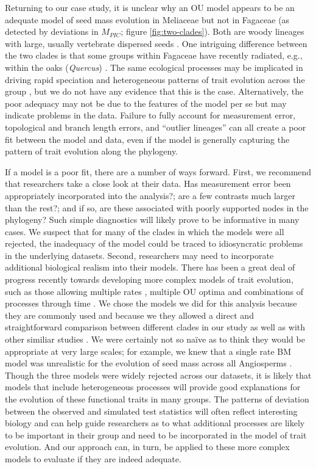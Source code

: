 \documentclass[a4paper,11pt]{article}
\begin{document}
Returning to our case study, it is unclear why an OU model appears to be an adequate model of seed mass evolution in Meliaceae but not in Fagaceae (as detected by deviations in $M_{PIC}$; figure \ref{fig:two-clades}).  
Both are woody lineages with large, usually vertebrate dispersed seeds \citep{Pannell1987, Manos2001}. One intriguing difference between the two clades is that some groups within Fagaceae have recently radiated, e.g., within the oaks (\emph{Quercus}) \citep{Simeone2013}. The same ecological processes may be implicated in driving rapid speciation and heterogeneous patterns of trait evolution across the group \citep{Schluter2000}, but we do not have any evidence that this is the case. Alternatively, the poor adequacy may not be due to the features of the model per se but may indicate problems in the data. Failure to fully account for measurement error, topological and branch length errors, and ``outlier lineages'' \citep[see][]{SlaterPennell} can all create a poor fit between the model and data, even if the model is generally capturing the pattern of trait evolution along the phylogeny.

If a model is a poor fit, there are a number of ways forward. First, we recommend that researchers take a close look at their data. Has measurement error been appropriately incorporated into the analysis?; are a few contrasts much larger than the rest?; and if so, are these associated with poorly supported nodes in the phylogeny? Such simple diagnostics will likely prove to be informative in many cases. We suspect that for many of the clades in which the models were all rejected, the inadequacy of the model could be traced to idiosyncratic problems in the underlying datasets. Second, researchers may need to incorporate additional biological realism into their models. There has been a great deal of progress recently towards developing more complex models of trait evolution, such as those allowing multiple rates \citep{Omeara2006, Thomas2006, Eastman2011}, multiple OU optima \citep{ButlerKing2004, Beaulieu2012, IngramMahler} and combinations of processes through time \citep{SlaterMEE}. We chose the models we did for this analysis because they are commonly used and because we they allowed a direct and straightforward comparison between different clades in our study as well as with other similiar studies \citep[e.g.,][]{Harmon2010}. We were certainly not so na\"{i}ve as to think they would be appropriate at very large scales; for example, we knew that a single rate BM model was unrealistic for the evolution of seed mass across all Angiosperms \citep{Moles2005}. Though the three models were widely rejected across our datasets, it is likely that models that include heterogeneous processes will provide good explanations for the evolution of these functional traits in many groups.  The patterns of deviation between the observed and simulated test statistics will often reflect interesting biology and can help guide researchers as to what additional processes are likely to be important in their group and need to be incorporated in the model of trait evolution. And our approach can, in turn, be applied to these more complex models to evaluate if they are indeed adequate. 
\end{document}
